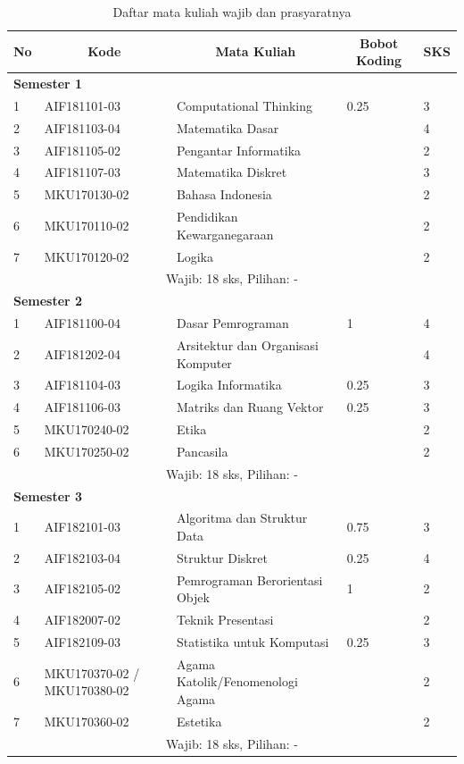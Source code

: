 \begin{table}[H]
	\centering
		\caption{Daftar mata kuliah wajib dan prasyaratnya}
		\begin{tabular}{|p{0.5cm}|p{2.85cm}|p{4.95cm}|p{2.7cm}|p{2.7cm}|}
			\hline
			\multicolumn{1}{|c|}{\textbf{No}} & \multicolumn{1}{c|}{\textbf{Kode}} & \multicolumn{1}{c|}{\textbf{Mata Kuliah}} & \multicolumn{1}{c|}{\textbf{Bobot Koding}} & \multicolumn{1}{c|}{\textbf{SKS}} \\ \hline
			\multicolumn{5}{|l|}{\textbf{Semester 1}} \\ \hline
			1 &	AIF181101-03 &	Computational Thinking &	0.25 &	3   \\ \hline
			2 &	AIF181103-04 &	Matematika Dasar &	&	4  \\ \hline
			3 &	AIF181105-02 &	Pengantar Informatika &  & 2  \\ \hline
			4	& AIF181107-03 &	Matematika Diskret &	&	3  \\ \hline
			5	& MKU170130-02 &	Bahasa Indonesia &	&	2  \\ \hline
			6	& MKU170110-02 &	Pendidikan Kewarganegaraan &	&	2  \\ \hline
			7	& MKU170120-02 &	Logika &	&	2  \\ \hline
			\multicolumn{5}{|c|}{Wajib: 18 sks, Pilihan: -} \\ \hline
			\multicolumn{5}{|l|}{\textbf{Semester 2}} \\ \hline
			1 &	AIF181100-04 &	Dasar Pemrograman &	1 &	4 \\ \hline
			2 &	AIF181202-04 &	Arsitektur dan Organisasi Komputer & &	4  \\ \hline
			3 &	AIF181104-03 &	Logika Informatika &	0.25 &	3  \\ \hline
			4 &	AIF181106-03 &	Matriks dan Ruang Vektor &	0.25 &	3  \\ \hline
			5 &	MKU170240-02 &	Etika	& &	2  \\ \hline
			6 &	MKU170250-02 &	Pancasila & &	2  \\ \hline
			\multicolumn{5}{|c|}{Wajib: 18 sks, Pilihan: - }\\ \hline
			\multicolumn{5}{|l|}{\textbf{Semester 3}} \\ \hline
			1 &	AIF182101-03 &	Algoritma dan Struktur Data &	0.75 &	3  \\ \hline
			2 &	AIF182103-04 &	Struktur Diskret &	0.25 &	4  \\ \hline
			3 &	AIF182105-02 &	Pemrograman Berorientasi Objek &	1 &	2   \\ \hline
			4 &	AIF182007-02 &	Teknik Presentasi &  &	2  \\ \hline
			5 &	AIF182109-03 &	Statistika untuk Komputasi &	0.25 &	3  \\ \hline
			6 &	MKU170370-02 / MKU170380-02 &	Agama Katolik/Fenomenologi Agama & &	2  \\ \hline
			7 &	MKU170360-02 &	Estetika & &	2  \\ \hline
			\multicolumn{5}{|c|}{Wajib: 18 sks, Pilihan: -} \\ \hline
		\end{tabular}
	\label{tab:strukturkurikulum2018}
\end{table}

